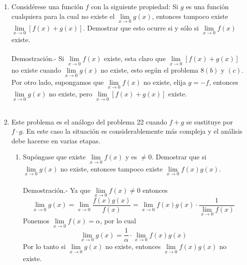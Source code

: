 \begin{enumerate}
\item Considérese una función $f$ con la siguiente propiedad: Si $g$ es una función cualquiera para la cual no existe el $\lim\limits_{x\to 0} g(x)$, entonces tampoco existe $\lim\limits_{x\to 0} [f(x)+g(x)]$. Demostrar que esto ocurre si y sólo si $\lim\limits_{x\to 0} f(x)$ existe.\\\\
    Demostración.-\; Si $\lim\limits_{x\to 0} f(x)$ existe, esta claro que $\lim\limits_{x\to 0} \left[f(x)+g(x)\right]$ no existe cuando $\lim\limits_{x\to 0} g(x)$ no existe, esto según el problema $8(b)$ y $(c)$. Por otro lado, supongamos que $\lim\limits_{x\to 0} f(x)$ no existe, elija $g=-f$, entonces $\lim\limits_{x\to 0} g(x)$ no existe, pero $\lim\limits_{x\to 0}\left[f(x)+g(x)\right]$ existe.\\\\

\item Este problema es el análogo del problema 22 cuando $f+g$ se sustituye por $f\cdot g$. En este caso la situación es considerablemente más compleja y el análisis debe hacerse en varias etapas.
\begin{enumerate}[\bfseries (a)]

    \item Supóngase que existe $\lim\limits_{x\to 0} f(x)$ y es $\neq 0$. Demostrar que si $\lim\limits_{x\to 0} g(x)$ no existe, entonces tampoco existe $\lim\limits_{x\to 0} f(x)g(x)$.\\\\
	Demostración.-\; Ya que $\lim\limits_{x\to 0} f(x) \neq 0$ entonces $$\lim_{x\to 0} g(x) = \lim_{x\to 0} \dfrac{f(x)g(x)}{f(x)} = \lim_{x\to 0} f(x)g(x)\cdot \dfrac{1}{\lim\limits_{x\to 0}f(x)}$$
	Ponemos $\lim\limits_{x\to 0}f(x)=\alpha$, por lo cual $$\lim_{x\to 0}g(x) = \dfrac{1}{\alpha} \cdot \lim_{x\to 0} f(x)g(x)$$
	Por lo tanto si $\lim\limits_{x\to 0} g(x)$ no existe, entonces $\lim\limits_{x\to 0} f(x)g(x)$ no existe.\\\\


\end{enumerate}
\end{enumerate}
